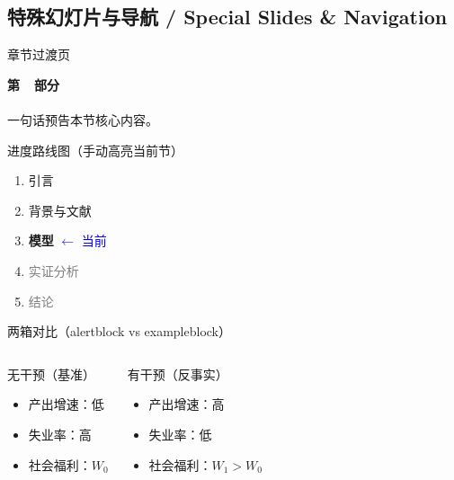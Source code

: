 \subsection{特殊幻灯片与导航 / Special Slides \& Navigation}

\begin{frame}{章节过渡页}
  \vspace*{\fill}
  \begin{center}
    {\Large \textbf{第~~部分}}\\[0.7em]
    {\large \insertsectionhead}\\[1.2em]
    {\normalsize 一句话预告本节核心内容。}
  \end{center}
  \vspace*{\fill}
\end{frame}

\begin{frame}{进度路线图（手动高亮当前节）}
  \begin{enumerate}
    \item[\checkmark] 引言
    \item[\checkmark] 背景与文献
    \item[\textbf{3.}] \textbf{模型} \quad \textcolor{blue}{$\leftarrow$ 当前}
    \item[4.] \textcolor{gray}{实证分析}
    \item[5.] \textcolor{gray}{结论}
  \end{enumerate}
\end{frame}

\begin{frame}{两箱对比（alertblock vs exampleblock）}
  \begin{columns}[T]
      \begin{alertblock}{无干预（基准）}
        \begin{itemize}
          \item 产出增速：低
          \item 失业率：高
          \item 社会福利：$W_0$
        \end{itemize}
      \end{alertblock}
      \begin{exampleblock}{有干预（反事实）}
        \begin{itemize}
          \item 产出增速：高
          \item 失业率：低
          \item 社会福利：$W_1 > W_0$
        \end{itemize}
      \end{exampleblock}
  \end{columns}
\end{frame}


